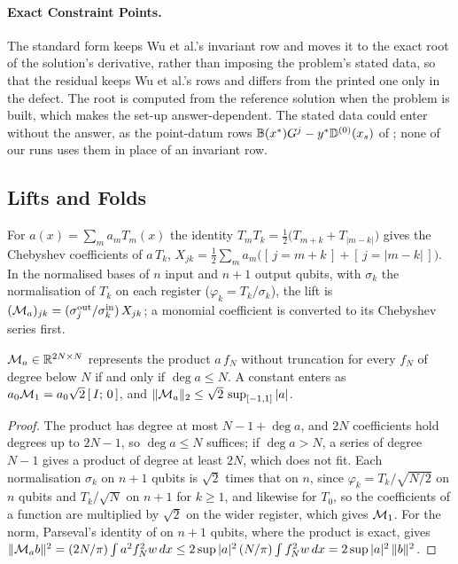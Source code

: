 \paragraph{Exact Constraint Points.} \label{app:exact-points}The standard form keeps Wu et al.'s invariant row and moves it to the exact root of the solution's derivative, rather than imposing the problem's stated data, so that the residual keeps Wu et al.'s rows and differs from the printed one only in the defect. The root is computed from the reference solution when the problem is built, which makes the set-up answer-dependent. The stated data could enter without the answer, as the point-datum rows $\mathbb{B}(x^*)G^{j}-y^*\mathbb{D}^{(0)}(x_s)$ of ; none of our runs uses them in place of an invariant row.

\subsection{Lifts and Folds}
\label{app:lifts-folds}

For $a(x)=\sum_ma_mT_m(x)$ the identity $T_mT_k=\tfrac12\bigl(T_{m+k}+T_{|m-k|}\bigr)$ gives the Chebyshev coefficients of $a\,T_k$, $X_{jk}=\tfrac12\sum_ma_m\bigl([\,j=m+k\,]+[\,j=|m-k|\,]\bigr)$. In the normalised bases of $n$ input and $n+1$ output qubits, with $\sigma_k$ the normalisation of $T_k$ on each register ($\varphi_k=T_k/\sigma_k$), the lift is $(\mathcal{M}_a)_{jk}=(\sigma^{\mathrm{out}}_j/\sigma^{\mathrm{in}}_k)\,X_{jk}$; a monomial coefficient is converted to its Chebyshev series first.

\begin{proposition}
\label{prop:lift}
$\mathcal{M}_a\in\mathbb R^{2N\times N}$ represents the product $a\,f_N$ without truncation for every $f_N$ of degree below $N$ if and only if $\deg a\le N$. A constant enters as $a_0\mathcal{M}_1=a_0\sqrt2\,[\,I;\,0\,]$, and $\|\mathcal{M}_a\|_2\le\sqrt2\,\sup_{[-1,1]}|a|$.
\end{proposition}
\begin{proof}
The product has degree at most $N-1+\deg a$, and $2N$ coefficients hold degrees up to $2N-1$, so $\deg a\le N$ suffices; if $\deg a>N$, a series of degree $N-1$ gives a product of degree at least $2N$, which does not fit. Each normalisation $\sigma_k$ on $n+1$ qubits is $\sqrt2$ times that on $n$, since $\varphi_k=T_k/\sqrt{N/2}$ on $n$ qubits and $T_k/\sqrt N$ on $n+1$ for $k\ge1$, and likewise for $T_0$, so the coefficients of a function are multiplied by $\sqrt2$ on the wider register, which gives $\mathcal{M}_1$. For the norm, Parseval's identity of  on $n+1$ qubits, where the product is exact, gives $\|\mathcal{M}_ab\|^2=(2N/\pi)\int a^2f_N^2w\,dx\le2\sup|a|^2\,(N/\pi)\int f_N^2w\,dx=2\sup|a|^2\,\|b\|^2$.
\end{proof}

